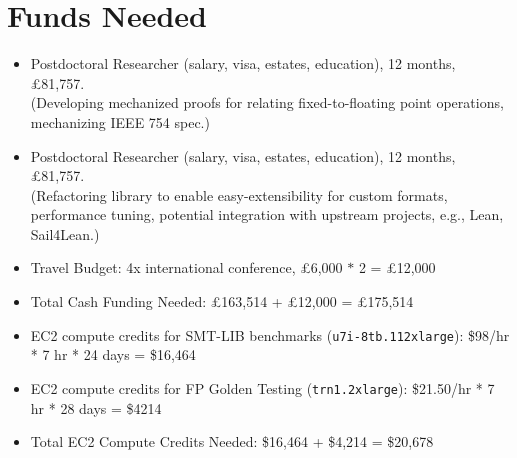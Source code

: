\documentclass[onecolumn]{article}
\begin{document}
\section{Funds Needed}

\begin{itemize}
\item Postdoctoral Researcher (salary, visa, estates, education), 12 months, £81,757. \\   %
  (Developing mechanized proofs for relating fixed-to-floating point operations,
  mechanizing IEEE 754 spec.) 
\item Postdoctoral Researcher (salary, visa, estates, education), 12 months, £81,757. \\   %
  (Refactoring library to enable easy-extensibility for custom formats, performance tuning, potential integration with upstream projects, e.g., Lean, Sail4Lean.) 
\item Travel Budget: 4x international conference, £6,000 $\ast$ 2 = £12,000 
\item Total Cash Funding Needed: £163,514 + £12,000 = £175,514
\item EC2 compute credits for SMT-LIB benchmarks (\texttt{u7i-8tb.112xlarge}): \$98/hr * 7 hr * 24 days = \$16,464
\item EC2 compute credits for FP Golden Testing (\texttt{trn1.2xlarge}): \$21.50/hr * 7 hr * 28 days = \$4214
\item Total EC2 Compute Credits Needed: \$16,464 + \$4,214 = \$20,678
\end{itemize}





\end{document}
